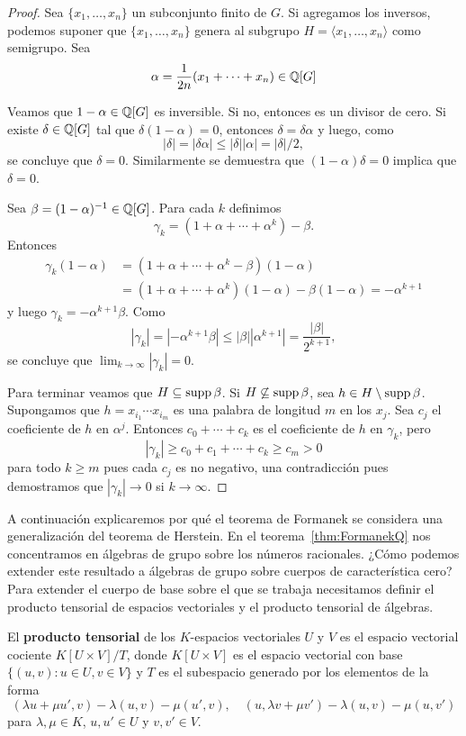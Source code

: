 \begin{exercise}
\begin{proof}
	Sea $\{x_1,\dots,x_n\}$ un subconjunto finito de $G$. Si agregamos los
	inversos, podemos suponer que $\{x_1,\dots,x_n\}$ genera al subgrupo
	$H=\langle x_1,\dots,x_n\rangle$ como semigrupo. Sea
	\[
		\alpha=\frac{1}{2n}(x_1+\cdots+x_n)\in\mathbb{Q}[G]
	\]

	Veamos que $1-\alpha\in\mathbb{Q}[G]$ es inversible. Si no, entonces es un divisor de cero. 
	Si existe $\delta\in\mathbb{Q}[G]$ tal que $\delta(1-\alpha)=0$, entonces
	$\delta=\delta\alpha$ y luego, como 
	\[
		|\delta|=|\delta\alpha|\leq|\delta||\alpha|=|\delta|/2,
	\]
	se concluye que $\delta=0$. Similarmente se demuestra que $(1-\alpha)\delta=0$ implica que
	$\delta=0$. 
	
	Sea $\beta=(1-\alpha)^{-1}\in\mathbb{Q}[G]$.  Para cada $k$ definimos 
	\[
		\gamma_k=(1+\alpha+\cdots+\alpha^k)-\beta.
	\]
	Entonces 
	\begin{align*}
		\gamma_k(1-\alpha)&=(1+\alpha+\cdots+\alpha^k-\beta)(1-\alpha)\\
		&=(1+\alpha+\cdots+\alpha^k)(1-\alpha)-\beta(1-\alpha)=-\alpha^{k+1}
	\end{align*}
	y luego 
	$\gamma_k=-\alpha^{k+1}\beta$. Como 
	\[
		|\gamma_k|=|-\alpha^{k+1}\beta|\leq|\beta||\alpha^{k+1}|=\frac{|\beta|}{2^{k+1}},
	\]
	se concluye que $\lim_{k\to\infty}|\gamma_k|=0$. 

	Para terminar veamos que $H\subseteq\operatorname{supp}\beta$. Si
	$H\not\subseteq\operatorname{supp}\beta$, sea $h\in H\setminus\operatorname{supp}\beta$.  Supongamos
	que $h=x_{i_1}\cdots x_{i_m}$ es una palabra de longitud $m$ en los $x_j$.
	Sea $c_j$ el coeficiente de $h$ en $\alpha^j$. Entonces $c_0+\cdots+c_k$ es
	el coeficiente de $h$ en $\gamma_k$, pero
	\[
		|\gamma_k|\geq c_0+c_1+\cdots+c_k\geq c_m>0
	\]
	para todo $k\geq m$ pues cada $c_j$ es no negativo, una contradicción pues
	demostramos que $|\gamma_k|\to 0$ si $k\to\infty$.
\end{proof}

A continuación explicaremos por qué el teorema de Formanek se considera una
generalización del teorema de Herstein. En el teorema~\ref{thm:FormanekQ} nos
concentramos en álgebras de grupo sobre los números racionales. ¿Cómo podemos
extender este resultado a álgebras de grupo sobre cuerpos de característica
cero? Para extender el cuerpo de base sobre el que se trabaja necesitamos
definir el producto tensorial de espacios vectoriales y el producto tensorial
de álgebras.

\begin{definition}
	El \textbf{producto tensorial} de los $K$-espacios vectoriales $U$ y $V$ es
	el espacio vectorial cociente $K[U\times V]/T$, donde $K[U\times V]$ es el
	espacio vectorial con base $\{(u,v):u\in U,v\in V\}$ y $T$ es el subespacio
	generado por los elementos de la forma
	\[
		(\lambda u+\mu u',v)-\lambda(u,v)-\mu(u',v),\quad
		(u,\lambda v+\mu v')-\lambda(u,v)-\mu(u,v')
	\]
	para $\lambda,\mu\in K$, $u,u'\in U$ y $v,v'\in V$.
\end{definition}


\end{exercise}
